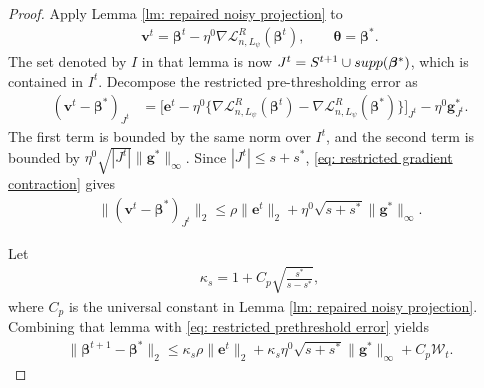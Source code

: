 \documentclass[letterpaper,12pt]{article}
\numberwithin{equation}{section}
\theoremstyle{plain}
\numberwithin{Theorem}{section}
\numberwithin{proposition}{section}
\numberwithin{Lemma}{section}
{
	\theoremstyle{definition}
	\newtheorem{Definition}{Definition}
	\newtheorem{example}{Example}
	\numberwithin{example}{section}
	\newtheorem{fact}{Fact}
	\numberwithin{fact}{section}
	\newtheorem{remark}{Remark}
}
\newcommand{\1}{\mathbbm{1}}
\def\bbeta{{\boldsymbol{\beta}}}
\def\supp{{\rm supp}}
\def\L{{\mathcal L}}
\begin{document}
\begin{proof}
Apply Lemma \ref{lm: repaired noisy projection} to
\begin{align*}
    \bm v^t=\bbeta^t-\eta^0\nabla\L_{n,L_\psi}^R(\bbeta^t),
    \qquad \bm\theta=\bbeta^*.
\end{align*}
The set denoted by $I$ in that lemma is now
$J^t=S^{t+1}\cup\supp(\bbeta^*)$, which is contained in $I^t$.
Decompose the restricted pre-thresholding error as
\begin{align*}
(\bm v^t-\bbeta^*)_{J^t}
&=\bigl[\bm e^t-\eta^0
  \{\nabla\L_{n,L_\psi}^R(\bbeta^t)
  -\nabla\L_{n,L_\psi}^R(\bbeta^*)\}
  \bigr]_{J^t}
  -\eta^0\bm g^*_{J^t}.
\end{align*}
The first term is bounded by the same norm over $I^t$, and the second
term is bounded by
$\eta^0\sqrt{|J^t|}\|\bm g^*\|_\infty$.  Since
$|J^t|\leq s+s^*$, \eqref{eq: restricted gradient contraction} gives
\begin{align}
\|(\bm v^t-\bbeta^*)_{J^t}\|_2
\leq \rho\|\bm e^t\|_2
     +\eta^0\sqrt{s+s^*}\|\bm g^*\|_\infty.               \label{eq: restricted prethreshold error}
\end{align}

Let
\begin{align*}
    \kappa_s=1+C_p\sqrt{\frac{s^*}{s-s^*}},
\end{align*}
where $C_p$ is the universal constant in Lemma
\ref{lm: repaired noisy projection}.  Combining that lemma with
\eqref{eq: restricted prethreshold error} yields
\begin{align}
    \|\bbeta^{t+1}-\bbeta^*\|_2
    \leq \kappa_s\rho\|\bm e^t\|_2
    +\kappa_s\eta^0\sqrt{s+s^*}\|\bm g^*\|_\infty
    +C_p\mathcal W_t.                                      \label{eq: noisy contraction before squaring}
\end{align}


\end{proof}
\end{document}
